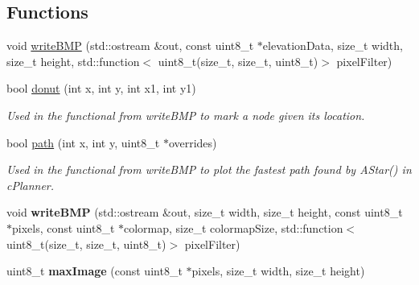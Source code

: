 \subsection*{Functions}
\begin{DoxyCompactItemize}
\item 
void \mbox{\hyperlink{namespacevisualizer_ab4e649cd7413a51ac1ae4b31a2994c3a}{write\+B\+MP}} (std\+::ostream \&out, const uint8\+\_\+t $\ast$elevation\+Data, size\+\_\+t width, size\+\_\+t height, std\+::function$<$ uint8\+\_\+t(size\+\_\+t, size\+\_\+t, uint8\+\_\+t)$>$ pixel\+Filter)
\item 
\mbox{\label{namespacevisualizer_a54813d6ff1e38d269bf94963e9e51638}} 
bool \mbox{\hyperlink{namespacevisualizer_a54813d6ff1e38d269bf94963e9e51638}{donut}} (int x, int y, int x1, int y1)
\begin{DoxyCompactList}\small\item\em Used in the functional from write\+B\+MP to mark a node given its location. \end{DoxyCompactList}\item 
\mbox{\label{namespacevisualizer_ab62e3ad6dc8e75a39f1f2927c935948e}} 
bool \mbox{\hyperlink{namespacevisualizer_ab62e3ad6dc8e75a39f1f2927c935948e}{path}} (int x, int y, uint8\+\_\+t $\ast$overrides)
\begin{DoxyCompactList}\small\item\em Used in the functional from write\+B\+MP to plot the fastest path found by A\+Star() in c\+Planner. \end{DoxyCompactList}\item 
\mbox{\label{namespacevisualizer_a63e82fd57f54a0051c341db82d96b1e4}} 
void {\bfseries write\+B\+MP} (std\+::ostream \&out, size\+\_\+t width, size\+\_\+t height, const uint8\+\_\+t $\ast$pixels, const uint8\+\_\+t $\ast$colormap, size\+\_\+t colormap\+Size, std\+::function$<$ uint8\+\_\+t(size\+\_\+t, size\+\_\+t, uint8\+\_\+t)$>$ pixel\+Filter)
\item 
\mbox{\label{namespacevisualizer_a9cda773a43b5cf710ef2b1e6db058dab}} 
uint8\+\_\+t {\bfseries max\+Image} (const uint8\+\_\+t $\ast$pixels, size\+\_\+t width, size\+\_\+t height)
\item 
\mbox{\label{namespacevisualizer_ac115086a69d45560015dc16c27349a97}} 

\end{DoxyCompactItemize}
